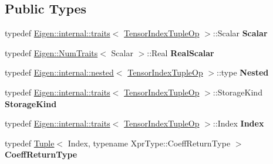 \subsection*{Public Types}
\begin{DoxyCompactItemize}
\item 
\mbox{\label{class_eigen_1_1_tensor_index_tuple_op_ada25b5a94fd5a919a80f72c3478e04bb}} 
typedef \hyperlink{struct_eigen_1_1internal_1_1traits}{Eigen\+::internal\+::traits}$<$ \hyperlink{class_eigen_1_1_tensor_index_tuple_op}{Tensor\+Index\+Tuple\+Op} $>$\+::Scalar {\bfseries Scalar}
\item 
\mbox{\label{class_eigen_1_1_tensor_index_tuple_op_a04116f19d77e9a07e94b4e48b768928e}} 
typedef \hyperlink{group___core___module_struct_eigen_1_1_num_traits}{Eigen\+::\+Num\+Traits}$<$ Scalar $>$\+::Real {\bfseries Real\+Scalar}
\item 
\mbox{\label{class_eigen_1_1_tensor_index_tuple_op_a8f7d33c25169173768ef774a606cf4b0}} 
typedef \hyperlink{struct_eigen_1_1internal_1_1nested}{Eigen\+::internal\+::nested}$<$ \hyperlink{class_eigen_1_1_tensor_index_tuple_op}{Tensor\+Index\+Tuple\+Op} $>$\+::type {\bfseries Nested}
\item 
\mbox{\label{class_eigen_1_1_tensor_index_tuple_op_acb7ce275fbc93f4fff38e9449569b527}} 
typedef \hyperlink{struct_eigen_1_1internal_1_1traits}{Eigen\+::internal\+::traits}$<$ \hyperlink{class_eigen_1_1_tensor_index_tuple_op}{Tensor\+Index\+Tuple\+Op} $>$\+::Storage\+Kind {\bfseries Storage\+Kind}
\item 
\mbox{\label{class_eigen_1_1_tensor_index_tuple_op_ac736460494fa1774d0088761cd6b57ac}} 
typedef \hyperlink{struct_eigen_1_1internal_1_1traits}{Eigen\+::internal\+::traits}$<$ \hyperlink{class_eigen_1_1_tensor_index_tuple_op}{Tensor\+Index\+Tuple\+Op} $>$\+::Index {\bfseries Index}
\item 
\mbox{\label{class_eigen_1_1_tensor_index_tuple_op_a2aefc32c63e29ce943098938f18d6b6e}} 
typedef \hyperlink{struct_eigen_1_1_tuple}{Tuple}$<$ Index, typename Xpr\+Type\+::\+Coeff\+Return\+Type $>$ {\bfseries Coeff\+Return\+Type}

\end{DoxyCompactItemize}
